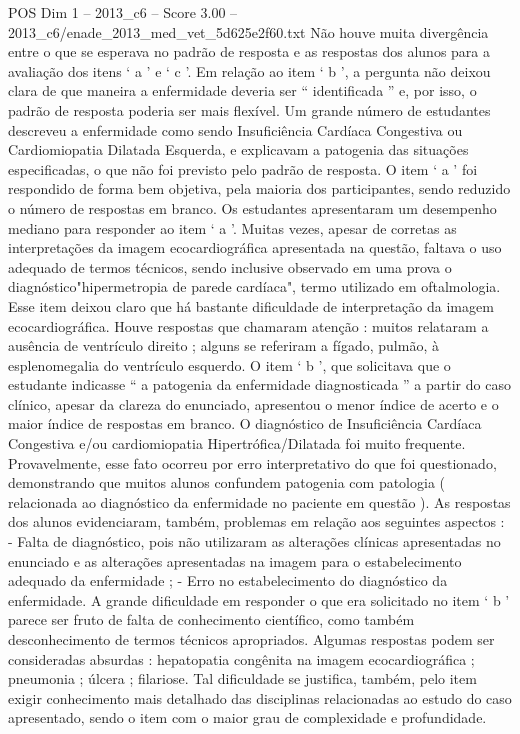 \begin{textsample}{POS Dim 1 – 2013\_c6 – Score 3.00 – 2013\_c6/enade\_2013\_med\_vet\_5d625e2f60.txt}
Não houve muita divergência entre o que se esperava no padrão de resposta e as respostas dos alunos para a avaliação dos itens ‘ a ’ e ‘ c ’.
Em relação ao item ‘ b ’, a pergunta não deixou clara de que maneira a enfermidade deveria ser “ identificada ” e, por isso, o padrão de resposta poderia ser mais flexível.
Um grande número de estudantes descreveu a enfermidade como sendo Insuficiência Cardíaca Congestiva ou Cardiomiopatia Dilatada Esquerda, e explicavam a patogenia das situações especificadas, o que não foi previsto pelo padrão de resposta.
O item ‘ a ’ foi respondido de forma bem objetiva, pela maioria dos participantes, sendo reduzido o número de respostas em branco.
Os estudantes apresentaram um desempenho mediano para responder ao item ‘ a ’.
Muitas vezes, apesar de corretas as interpretações da imagem ecocardiográfica apresentada na questão, faltava o uso adequado de termos técnicos, sendo inclusive observado em uma prova o diagnóstico"hipermetropia de parede cardíaca", termo utilizado em oftalmologia.
Esse item deixou claro que há bastante dificuldade de interpretação da imagem ecocardiográfica.
Houve respostas que chamaram atenção : muitos relataram a ausência de ventrículo direito ; alguns se referiram a fígado, pulmão, à esplenomegalia do ventrículo esquerdo.
O item ‘ b ’, que solicitava que o estudante indicasse “ a patogenia da enfermidade diagnosticada ” a partir do caso clínico, apesar da clareza do enunciado, apresentou o menor índice de acerto e o maior índice de respostas em branco.
O diagnóstico de Insuficiência Cardíaca Congestiva e/ou cardiomiopatia Hipertrófica/Dilatada foi muito frequente.
Provavelmente, esse fato ocorreu por erro interpretativo do que foi questionado, demonstrando que muitos alunos confundem patogenia com patologia ( relacionada ao diagnóstico da enfermidade no paciente em questão ).
As respostas dos alunos evidenciaram, também, problemas em relação aos seguintes aspectos : - Falta de diagnóstico, pois não utilizaram as alterações clínicas apresentadas no enunciado e as alterações apresentadas na imagem para o estabelecimento adequado da enfermidade ; - Erro no estabelecimento do diagnóstico da enfermidade.
A grande dificuldade em responder o que era solicitado no item ‘ b ’ parece ser fruto de falta de conhecimento científico, como também desconhecimento de termos técnicos apropriados.
Algumas respostas podem ser consideradas absurdas : hepatopatia congênita na imagem ecocardiográfica ; pneumonia ; úlcera ; filariose.
Tal dificuldade se justifica, também, pelo item exigir conhecimento mais detalhado das disciplinas relacionadas ao estudo do caso apresentado, sendo o item com o maior grau de complexidade e profundidade.

\end{textsample}
